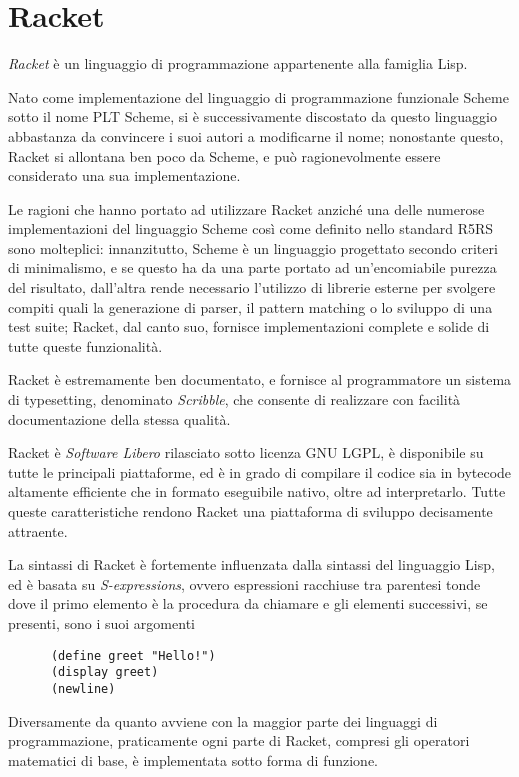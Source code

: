 \section{Racket}

\emph{Racket} \`e un linguaggio di programmazione appartenente alla
famiglia Lisp.

Nato come implementazione del linguaggio di programmazione funzionale Scheme
sotto il nome PLT Scheme, si \`e successivamente discostato da questo
linguaggio abbastanza da convincere i suoi autori a modificarne il nome;
nonostante questo, Racket si allontana ben poco da Scheme, e pu\`o
ragionevolmente essere considerato una sua implementazione.

Le ragioni che hanno portato ad utilizzare Racket anzich\'e una delle
numerose implementazioni del linguaggio Scheme cos\`i come definito nello
standard R5RS sono molteplici: innanzitutto, Scheme \`e un linguaggio
progettato secondo criteri di minimalismo, e se questo ha da una parte
portato ad un'encomiabile purezza del risultato, dall'altra rende necessario
l'utilizzo di librerie esterne per svolgere compiti quali la generazione di
parser, il pattern matching o lo sviluppo di una test suite; Racket, dal
canto suo, fornisce implementazioni complete e solide di tutte queste
funzionalit\`a.

Racket \`e estremamente ben documentato, e fornisce al programmatore un
sistema di typesetting, denominato \emph{Scribble}, che consente di
realizzare con facilit\`a documentazione della stessa qualit\`a.

Racket \`e \emph{Software Libero} rilasciato sotto licenza GNU LGPL, \`e
disponibile su tutte le principali piattaforme, ed \`e in grado di compilare
il codice sia in bytecode altamente efficiente che in formato eseguibile
nativo, oltre ad interpretarlo. Tutte queste caratteristiche rendono Racket
una piattaforma di sviluppo decisamente attraente.

La sintassi di Racket \`e fortemente influenzata dalla sintassi del
linguaggio Lisp, ed \`e basata su \emph{S-expressions}, ovvero espressioni
racchiuse tra parentesi tonde dove il primo elemento \`e la procedura
da chiamare e gli elementi successivi, se presenti, sono i suoi argomenti

\begin{lstlisting}
      (define greet "Hello!")
      (display greet)
      (newline)
\end{lstlisting}

Diversamente da quanto avviene con la maggior parte dei linguaggi di
programmazione, praticamente ogni parte di Racket, compresi gli operatori
matematici di base, \`e implementata sotto forma di funzione.

